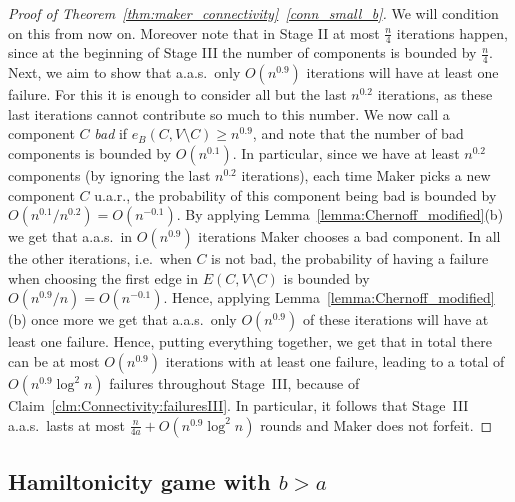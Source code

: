 \documentclass[11pt, a4paper]{article}
\numberwithin{equation}{section}
\numberwithin{figure}{section}
\begin{document}
\begin{proof}[Proof of Theorem~\ref{thm:maker_connectivity}~\ref{conn_small_b}]
We will condition on this from now on.
Moreover note that in Stage II at most $\frac{n}{4}$
iterations happen, since at the beginning of Stage III the number of components is bounded by $\frac{n}{4}$.
Next, we aim to show that a.a.s.~only $O(n^{0.9})$ iterations will have at least one failure. For this it is enough
to consider all but the last $n^{0.2}$ iterations, as these last iterations cannot contribute so much to this number.
We now call a component $C$ \textit{bad} if $e_B(C,V\setminus C)\geq n^{0.9}$, and note that
the number of bad components is bounded by $O(n^{0.1})$.
In particular, since we have at least $n^{0.2}$ components (by ignoring the last $n^{0.2}$ iterations), 
each time Maker picks a new component $C$ u.a.r.,
the probability of this component being bad is bounded by
$O(n^{0.1}/n^{0.2})=O(n^{-0.1})$.
By applying Lemma~\ref{lemma:Chernoff_modified}(b) we get that a.a.s.~in $O(n^{0.9})$
iterations Maker chooses a bad component.
In all the other iterations, i.e.~when $C$ is not bad,
the probability of having a failure when 
choosing the first edge in $E(C,V\setminus C)$
is bounded by $O(n^{0.9}/n)=O(n^{-0.1})$.
Hence, applying  Lemma~\ref{lemma:Chernoff_modified}(b) once more we get that a.a.s.~only $O(n^{0.9})$ of these iterations will have at least one failure.
Hence, putting everything together, we get that in total there can be at most $O(n^{0.9})$
iterations with at least one failure,
leading to a total of $O(n^{0.9}\log^2 n)$ failures
throughout Stage~III, because of Claim~\ref{clm:Connectivity:failuresIII}.
In particular, it follows that Stage~III a.a.s.~lasts at most $\frac{n}{4a} + O(n^{0.9}\log^2 n)$
rounds and Maker does not forfeit.
\end{proof}





\bigskip



\subsection{Hamiltonicity game with $b > a$}
\end{document}
